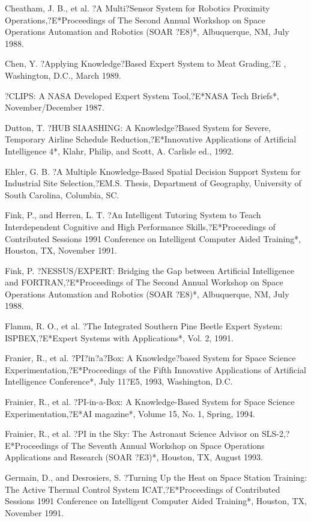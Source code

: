 \documentclass[letterpaper,10pt,english]{sphinxmanual}
\begin{document}
Cheatham, J. B., et al. ?A Multi?Sensor System for Robotics Proximity
Operations,?E*Proceedings of The Second Annual Workshop on Space
Operations Automation and Robotics (SOAR ?E8)*, Albuquerque, NM, July
1988.

Chen, Y. ?Applying Knowledge?Based Expert System to Meat Grading,?E
,
Washington, D.C., March 1989.

?CLIPS: A NASA Developed Expert System Tool,?E*NASA Tech Briefs*,
November/December 1987.

Dutton, T. ?HUB SIAASHING: A Knowledge?Based System for Severe,
Temporary Airline Schedule Reduction,?E*Innovative Applications of
Artificial Intelligence 4*, Klahr, Philip, and Scott, A. Carlisle ed.,
1992.

Ehler, G. B. ?A Multiple Knowledge-Based Spatial Decision Support System
for Industrial Site Selection,?EM.S. Thesis, Department of Geography,
University of South Carolina, Columbia, SC.

Fink, P., and Herren, L. T. ?An Intelligent Tutoring System to Teach
Interdependent Cognitive and High Performance Skills,?E*Proceedings of
Contributed Sessions 1991 Conference on Intelligent Computer Aided
Training*, Houston, TX, November 1991.

Fink, P. ?NESSUS/EXPERT: Bridging the Gap between Artificial
Intelligence and FORTRAN,?E*Proceedings of The Second Annual Workshop on
Space Operations Automation and Robotics (SOAR ?E8)*, Albuquerque, NM,
July 1988.

Flamm, R. O., et al. ?The Integrated Southern Pine Beetle Expert System:
ISPBEX,?E*Expert Systems with Applications*, Vol. 2, 1991.

Franier, R., et al. ?PI?in?a?Box: A Knowledge?based System for Space
Science Experimentation,?E*Proceedings of the Fifth Innovative
Applications of Artificial Intelligence Conference*, July 11?E5, 1993,
Washington, D.C.

Frainier, R., et al. ?PI-in-a-Box: A Knowledge-Based System for Space
Science Experimentation,?E*AI magazine*, Volume 15, No. 1, Spring, 1994.

Frainier, R., et al. ?PI in the Sky: The Astronaut Science Advisor on
SLS-2,?E*Proceedings of The Seventh Annual Workshop on Space Operations
Applications and Research (SOAR ?E3)*, Houston, TX, August 1993.

Germain, D., and Desrosiers, S. ?Turning Up the Heat on Space Station
Training: The Active Thermal Control System ICAT,?E*Proceedings of
Contributed Sessions 1991 Conference on Intelligent Computer Aided
Training*, Houston, TX, November 1991.
\end{document}
